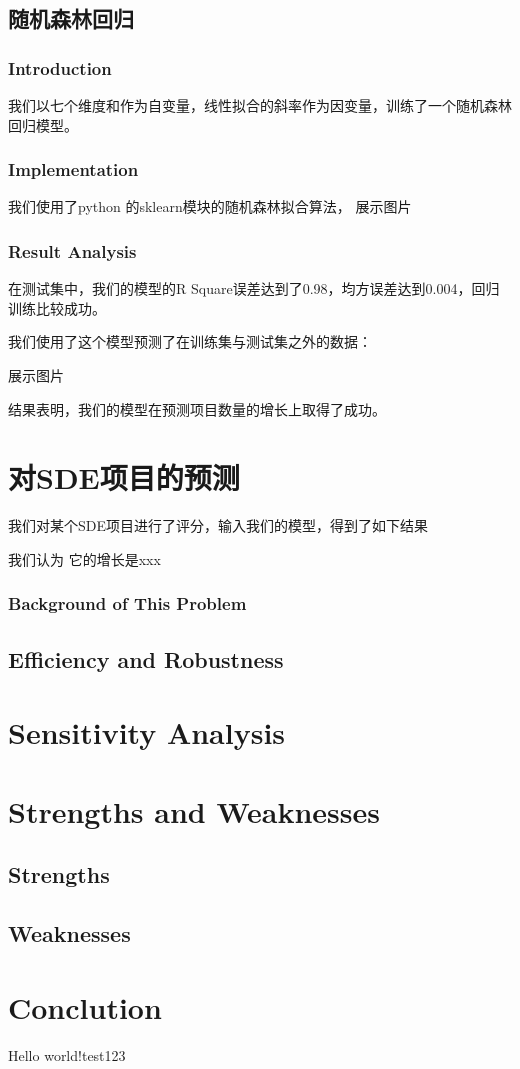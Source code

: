 \documentclass[a4paper]{article}
\begin{document}
\subsection{随机森林回归}
\subsubsection{Introduction}

我们以七个维度和作为自变量，线性拟合的斜率作为因变量，训练了一个随机森林回归模型。

\subsubsection{Implementation}
我们使用了python 的sklearn模块的随机森林拟合算法，
展示图片


\subsubsection{Result Analysis}
在测试集中，我们的模型的R Square误差达到了0.98，均方误差达到0.004，回归训练比较成功。

我们使用了这个模型预测了在训练集与测试集之外的数据：

展示图片

结果表明，我们的模型在预测项目数量的增长上取得了成功。



\section{对SDE项目的预测}
我们对某个SDE项目进行了评分，输入我们的模型，得到了如下结果

我们认为 它的增长是xxx
\subsubsection{Background of This Problem}
\subsection{Efficiency and Robustness}
\section{Sensitivity Analysis}
\section{Strengths and Weaknesses}
\subsection{Strengths}
\subsection{Weaknesses}
\section{Conclution}
Hello world!test123
\end{document}
